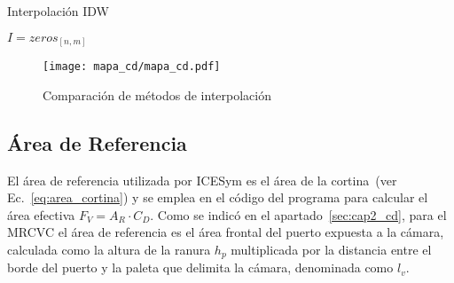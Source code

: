 \begin{algorithm}
    \caption{Interpolación IDW}\label{algo:IDW}


    \BlankLine
    $I=zeros_{[n,m]}$\;
\end{algorithm}



\begin{figure}
    \centering
    \texttt{[image: mapa\_cd/mapa\_cd.pdf]}
    \caption{Comparación de métodos de interpolación}\label{fig:mapas_interpolados}
\end{figure}


\subsection{Área de Referencia}
%
El área de referencia utilizada por ICESym es el área de la cortina~(ver
Ec.~\ref{eq:area_cortina}) y se emplea en el código del programa para calcular
el área efectiva $F_{V}=A_{R}\cdot C_{D}$.
%
Como se indicó en el apartado~\ref{sec:cap2_cd}, para el  MRCVC el área de
referencia es el área frontal del puerto expuesta a la cámara, calculada como la
altura de la ranura $h_{p}$ multiplicada por la distancia entre el borde del
puerto y la paleta que delimita la cámara, denominada como $l_{v}$.

